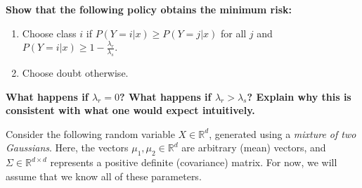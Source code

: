 \begin{Parts}

\Part \textbf{Show that the following policy obtains the minimum risk:}
	\begin{enumerate}
		\item Choose class $i$ if $P(Y=i|x) \geq P(Y=j|x)$ for all $j$ and $P(Y=i|x) \geq 1 - \frac{\lambda_r}{\lambda_s}$.
		\item Choose doubt otherwise.
	\end{enumerate}



\Part \textbf{What happens if $\lambda_r=0$?  What happens if $\lambda_r>\lambda_s$? Explain why this is consistent with what one would expect intuitively.}



\end{Parts}

Consider the following random variable $X \in \mathbb{R}^d$, generated using a \emph{mixture of two Gaussians}. Here, the vectors $\mu_1, \mu_2 \in \mathbb{R}^d$ are arbitrary (mean) vectors, and $\Sigma \in \mathbb{R}^{d \times d}$ represents a positive definite (covariance) matrix. For now, we will assume that we know all of these parameters.

